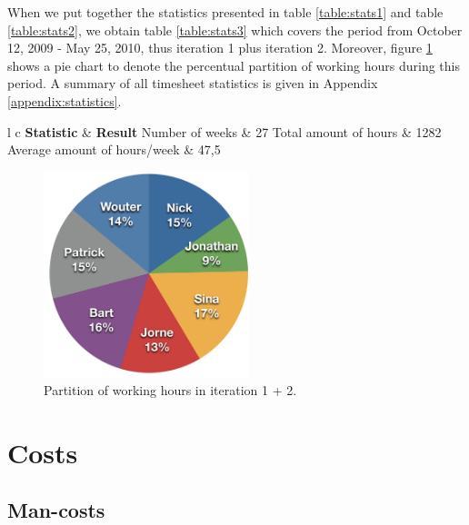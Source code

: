 \documentclass[salesmen, twoside]{../../../templates/latex/2009/softproj}
\begin{document}
\begin{projdoc}
			When we put together the statistics presented in table \ref{table:stats1} and table \ref{table:stats2}, we obtain table \ref{table:stats3} which covers the period from October 12, 2009 - May 25, 2010, thus iteration 1 plus iteration 2.
			Moreover, figure \ref{fig:stats3} shows a pie chart to denote the percentual partition of working hours during this period. A summary of all timesheet statistics is given in Appendix \ref{appendix:statistics}.
			
			\begin{table}
				\begin{center}
			\begin{tabular}{l c}
				\FL \textbf{Statistic} & \textbf{Result}
				\ML Number of weeks & 27
				\NN Total amount of hours  & 1282
				\NN Average amount of hours/week & 47,5
			\end{tabular}
			\caption{General statistics for iteration 1 + 2.}
			\label{table:stats3}
			\end{center}
			\end{table}
			
			\begin{figure}
				\begin{center}
				\includegraphics[height=6cm]{../../img/partition-total.jpg}
				\caption{Partition of working hours in iteration 1 + 2.}
				\label{fig:stats3}
				\end{center}
			\end{figure}
			
						
			
			\section{Costs}
			
			\subsection{Man-costs}
			\label{sec:costsofar}
			

\end{projdoc}
\end{document}
